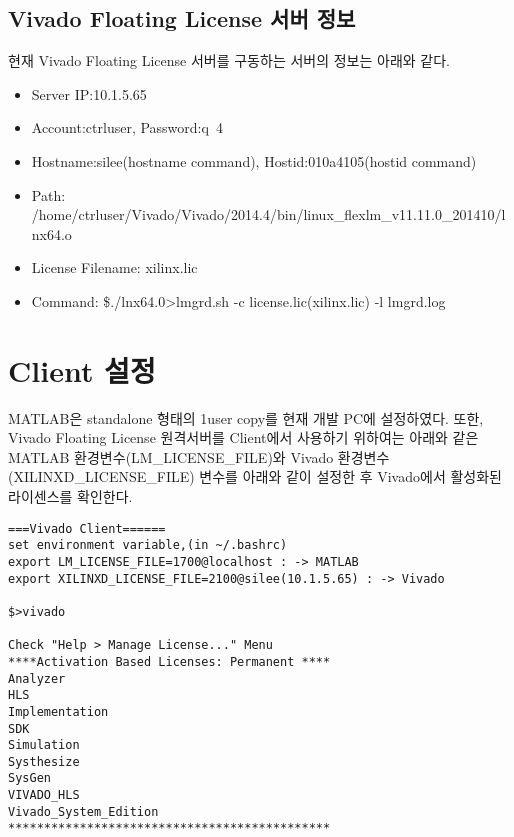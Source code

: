 \documentclass[11pt
  , a4paper
  , article
  , oneside
]{memoir}
\begin{document}
\section{Vivado Floating License 서버 정보}
현재 Vivado Floating License 서버를 구동하는 서버의 정보는 아래와 같다.

\begin{itemize}
	\item Server IP:10.1.5.65 
	\item Account:ctrluser, Password:q~4
	\item Hostname:silee(hostname command), Hostid:010a4105(hostid command)
	\item Path: /home/ctrluser/Vivado/Vivado/2014.4/bin/linux\_flexlm\_v11.11.0\_201410/lnx64.o
	\item License Filename: xilinx.lic
	\item Command: \$./lnx64.0>lmgrd.sh -c license.lic(xilinx.lic) -l lmgrd.log
\end{itemize}

\chapter{Client 설정}
MATLAB은 standalone 형태의 1user copy를 현재 개발 PC에 설정하였다. 또한, Vivado Floating License 원격서버를 Client에서 사용하기 위하여는 아래와 같은 MATLAB 환경변수(LM\_LICENSE\_FILE)와 Vivado 환경변수(XILINXD\_LICENSE\_FILE) 변수를 아래와 같이 설정한 후 Vivado에서 활성화된 라이센스를 확인한다.

\begin{lstlisting}[style=termstyle, escapechar=!]
===Vivado Client======
set environment variable,(in ~/.bashrc)
export LM_LICENSE_FILE=1700@localhost : -> MATLAB
export XILINXD_LICENSE_FILE=2100@silee(10.1.5.65) : -> Vivado

$>vivado

Check "Help > Manage License..." Menu
****Activation Based Licenses: Permanent ****
Analyzer
HLS
Implementation
SDK
Simulation
Systhesize
SysGen
VIVADO_HLS
Vivado_System_Edition
*********************************************
\end{lstlisting}

\clearpage


\end{document}
